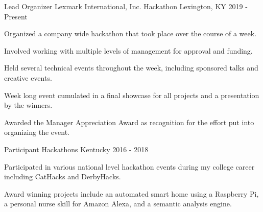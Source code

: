 

\begin{cventries}

  \cventry
    {Lead Organizer} %
    {Lexmark International, Inc. Hackathon} %
    {Lexington, KY} %
    {2019 - Present} %
    {
      \begin{cvitems} %
        \item {Organized a company wide hackathon that took place over the course of a week.}
        \item {Involved working with multiple levels of management for approval and funding.}
        \item {Held several technical events throughout the week, including sponsored talks and creative events.}
	\item {Week long event cumulated in a final showcase for all projects and a presentation by the winners.}
	\item {Awarded the Manager Appreciation Award as recognition for the effort put into organizing the event.}
      \end{cvitems}
    }

  \cventry
    {Participant} %
    {Hackathons} %
    {Kentucky} %
    {2016 - 2018} %
    {
      \begin{cvitems} %
        \item {Participated in various national level hackathon events during my college career including CatHacks and DerbyHacks.}
	\item {Award winning projects include an automated smart home using a Raspberry Pi, a personal nurse skill for Amazon Alexa, and a semantic analysis engine.}
      \end{cvitems}
    }

\iffalse
  \cventry
    {Member} %
    {Competative Programming Team} %
    {University of Kentucky} %
    {Aug. 2015 - 2017} %
    {
      \begin{cvitems} %
        \item {Represented the university in national programming competitions.}
      \end{cvitems}
    }
\fi
\end{cventries}

